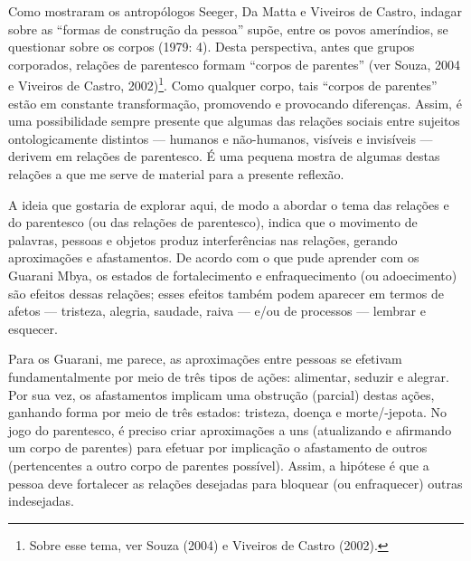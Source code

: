 \documentclass{article}
\begin{document}
Como mostraram os antrop\'ologos Seeger, Da Matta e Viveiros de Castro,
indagar sobre as {\textquotedblleft}formas de constru\c{c}\~ao da
pessoa{\textquotedblright} sup\~oe, entre os povos amer\'indios, se
questionar sobre os corpos (1979: 4). Desta perspectiva, antes que
grupos corporados, rela\c{c}\~oes de parentesco formam
{\textquotedblleft}corpos de parentes{\textquotedblright} (ver Souza,
2004 e Viveiros de Castro, 2002)\footnote{ Sobre esse tema, ver Souza
(2004) e Viveiros de Castro (2002).}. Como qualquer corpo, tais
{\textquotedblleft}corpos de parentes{\textquotedblright} est\~ao em
constante transforma\c{c}\~ao, promovendo e provocando diferen\c{c}as.
Assim, \'e uma possibilidade sempre presente que algumas das
rela\c{c}\~oes sociais entre sujeitos ontologicamente distintos ---
humanos e n\~ao-humanos, vis\'iveis e invis\'iveis --- derivem em
rela\c{c}\~oes de parentesco. \'E uma pequena mostra de algumas destas
rela\c{c}\~oes a que me serve de material para a presente reflex\~ao.

A ideia que gostaria de explorar aqui, de modo a abordar o tema das
rela\c{c}\~oes e do parentesco (ou das rela\c{c}\~oes de parentesco),
indica que o movimento de palavras, pessoas e objetos produz
interfer\^encias nas rela\c{c}\~oes, gerando aproxima\c{c}\~oes e
afastamentos. De acordo com o que pude aprender com os Guarani Mbya, os
estados de fortalecimento e enfraquecimento (ou adoecimento) s\~ao
efeitos dessas rela\c{c}\~oes; esses efeitos tamb\'em podem aparecer em
termos de afetos --- tristeza, alegria, saudade, raiva --- e/ou de
processos --- lembrar e esquecer.

Para os Guarani, me parece, as aproxima\c{c}\~oes entre pessoas se
efetivam fundamentalmente por meio de tr\^es tipos de a\c{c}\~oes:
alimentar, seduzir e alegrar. Por sua vez, os afastamentos implicam uma
obstru\c{c}\~ao (parcial) destas a\c{c}\~oes, ganhando forma por meio
de tr\^es estados: tristeza, doen\c{c}a e morte/-jepota. No jogo do
parentesco, \'e preciso criar aproxima\c{c}\~oes a uns (atualizando e
afirmando um corpo de parentes) para efetuar por implica\c{c}\~ao o
afastamento de outros (pertencentes a outro corpo de parentes
poss\'ivel). Assim, a hip\'otese \'e que a pessoa deve fortalecer as
rela\c{c}\~oes desejadas para bloquear (ou enfraquecer) outras
indesejadas.
\end{document}
